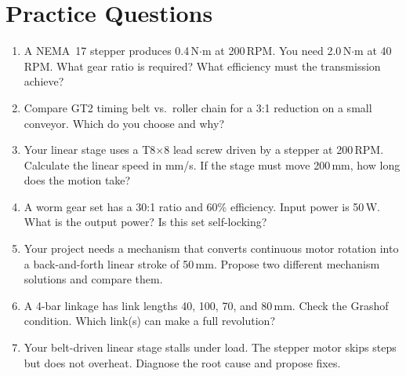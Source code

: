 \section{Practice Questions}
\begin{enumerate}[leftmargin=1.5em]
\item A NEMA~17 stepper produces 0.4\,N$\cdot$m at 200\,RPM. You need 2.0\,N$\cdot$m at 40\,RPM. What gear ratio is required? What efficiency must the transmission achieve?
\item Compare GT2 timing belt vs.\ roller chain for a 3:1 reduction on a small conveyor. Which do you choose and why?
\item Your linear stage uses a T8$\times$8 lead screw driven by a stepper at 200\,RPM. Calculate the linear speed in mm/s. If the stage must move 200\,mm, how long does the motion take?
\item A worm gear set has a 30:1 ratio and 60\% efficiency. Input power is 50\,W. What is the output power? Is this set self-locking?
\item Your project needs a mechanism that converts continuous motor rotation into a back-and-forth linear stroke of 50\,mm. Propose two different mechanism solutions and compare them.
\item A 4-bar linkage has link lengths 40, 100, 70, and 80\,mm. Check the Grashof condition. Which link(s) can make a full revolution?
\item Your belt-driven linear stage stalls under load. The stepper motor skips steps but does not overheat. Diagnose the root cause and propose fixes.
\end{enumerate}

